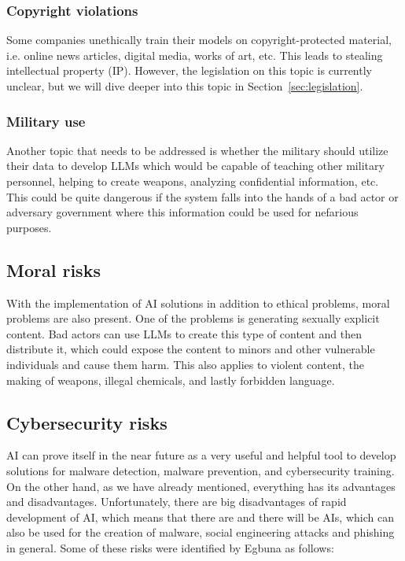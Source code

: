 \subsubsection*{Copyright violations}

Some companies unethically train their models on copyright-protected material, i.e. online news articles, digital media, works of art, etc. This leads to stealing intellectual property (IP). However, the legislation on this topic is currently unclear, but we will dive deeper into this topic in Section~\ref{sec:legislation}.

\subsubsection*{Military use}

Another topic that needs to be addressed is whether the military should utilize their data to develop LLMs which would be capable of teaching other military personnel, helping to create weapons, analyzing confidential information, etc. This could be quite dangerous if the system falls into the hands of a bad actor or adversary government where this information could be used for nefarious purposes.


\subsection{Moral risks}
With the implementation of AI solutions in addition to ethical problems, moral problems are also present. One of the problems is generating sexually explicit content. Bad actors can use LLMs to create this type of content and then distribute it, which could expose the content to minors and other vulnerable individuals and cause them harm. This also applies to violent content, the making of weapons, illegal chemicals, and lastly forbidden language.


\subsection{Cybersecurity risks}
AI can prove itself in the near future as a very useful and helpful tool to develop solutions for malware detection, malware prevention, and cybersecurity training. On the other hand, as we have already mentioned, everything has its advantages and disadvantages. Unfortunately, there are big disadvantages of rapid development of AI, which means that there are and there will be AIs, which can also be used for the creation of malware, social engineering attacks and phishing in general. Some of these risks were identified by Egbuna \cite{Princess-Egbuna_2021} as follows:

